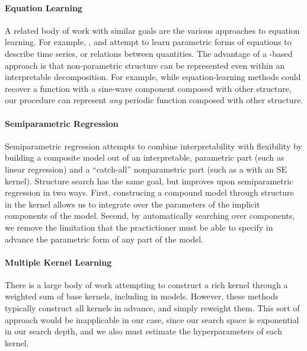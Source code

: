\documentclass[twoside]{article}
\begin{document}
\paragraph{Equation Learning}
A related body of work with similar goals are the various approaches to equation learning.  
For example, \cite{schmidt2009distilling}, \cite{dzeroski1999equation} and \cite{washio1999discovering} attempt to learn parametric forms of equations to describe time series, or relations between quantities.  The advantage of a \gp{}-based approach is that non-parametric structure can be represented even within an interpretable decomposition.  For example, while equation-learning methods could recover a function with a sine-wave component composed with other structure, our procedure can represent \emph{any} periodic function composed with other structure.

\paragraph{Semiparametric Regression}
Semiparametric regression  attempts to combine interpretability with flexibility by building  a composite model out of an interpretable, parametric part (such as linear regression) and a ``catch-all'' nonparametric part (such as a \gp{} with an SE kernel).
Structure search has the same goal, but improves upon semiparametric regression in two ways.
First, construcing a compound model through structure in the kernel allows us to integrate over the parameters of the implicit components of the model.
Second, by automatically searching over components, we remove the limitation that the practictioner must be able to specify in advance the parametric form of any part of the model.


\paragraph{Multiple Kernel Learning}
There is a large body of work attempting to construct a rich kernel through a weighted sum of base kernels, including in \gp{} models.  
\cite{christoudias2009bayesian}
However, these methods typically construct all kernels in advance, and simply reweight them.  This sort of approach would be inapplicable in our case, since our search space is exponential in our search depth, and we also must estimate the hyperparameters of each kernel.%
\end{document}
